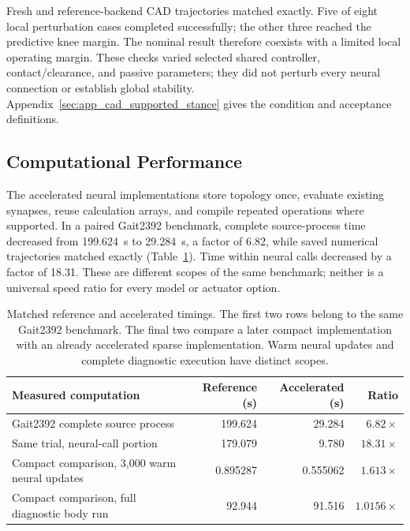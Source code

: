 Fresh and reference-backend CAD trajectories matched exactly. Five of eight local perturbation cases completed successfully; the other three reached the predictive knee margin. The nominal result therefore coexists with a limited local operating margin. These checks varied selected shared controller, contact/clearance, and passive parameters; they did not perturb every neural connection or establish global stability. Appendix~\ref{sec:app_cad_supported_stance} gives the condition and acceptance definitions.

\subsection{Computational Performance}\label{sec:sns_execution}

The accelerated neural implementations store topology once, evaluate existing synapses, reuse calculation arrays, and compile repeated operations where supported. In a paired Gait2392 benchmark, complete source-process time decreased from \qty{199.624}{\second} to \qty{29.284}{\second}, a factor of 6.82, while saved numerical trajectories matched exactly (Table~\ref{tab:sns_runtime}). Time within neural calls decreased by a factor of 18.31. These are different scopes of the same benchmark; neither is a universal speed ratio for every model or actuator option.

\begin{table}[htbp]
\centering\small
\caption[Scoped computational performance comparisons]{Matched reference and accelerated timings. The first two rows belong to the same Gait2392 benchmark. The final two compare a later compact implementation with an already accelerated sparse implementation. Warm neural updates and complete diagnostic execution have distinct scopes.}
\label{tab:sns_runtime}
\begin{tabularx}{\textwidth}{@{}>{\raggedright\arraybackslash}Xrrr@{}}
\toprule
Measured computation & Reference (s) & Accelerated (s) & Ratio \\
\midrule
Gait2392 complete source process & 199.624 & 29.284 & $6.82\times$ \\
Same trial, neural-call portion & 179.079 & 9.780 & $18.31\times$ \\
Compact comparison, 3,000 warm neural updates & 0.895287 & 0.555062 & $1.613\times$ \\
Compact comparison, full diagnostic body run & 92.944 & 91.516 & $1.0156\times$ \\
\bottomrule
\end{tabularx}
\end{table}

